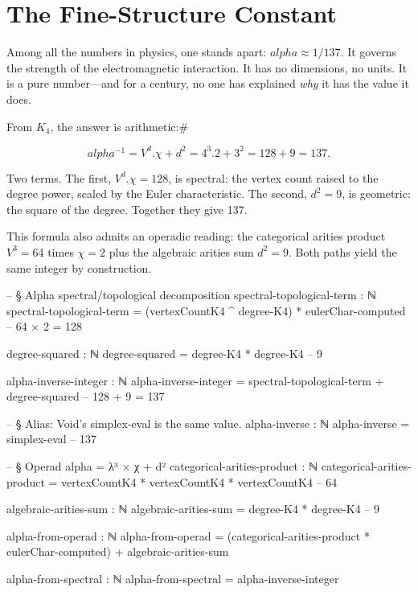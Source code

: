 \documentclass[11pt,a4paper]{book}
\def\alpha{alpha}%
\def\cdot{.}%
\begin{document}
\section{The Fine-Structure Constant}

Among all the numbers in physics, one stands apart: $\alpha \approx 1/137$. It governs the strength of the electromagnetic interaction. It has no dimensions, no units. It is a pure number---and for a century, no one has explained \emph{why} it has the value it does.

From $K_4$, the answer is arithmetic:# 

\[
\alpha^{-1} = V^d \cdot \chi + d^2 = 4^3 \cdot 2 + 3^2 = 128 + 9 = 137.
\]

Two terms. The first, $V^d \cdot \chi = 128$, is spectral: the vertex count raised to the degree power, scaled by the Euler characteristic. The second, $d^2 = 9$, is geometric: the square of the degree. Together they give 137.

This formula also admits an operadic reading: the categorical arities product $V^3 = 64$ times $\chi = 2$ plus the algebraic arities sum $d^2 = 9$. Both paths yield the same integer by construction.

\begin{code}
-- § Alpha spectral/topological decomposition
spectral-topological-term : ℕ
spectral-topological-term = (vertexCountK4 ^ degree-K4) * eulerChar-computed  -- 64 × 2 = 128

degree-squared : ℕ
degree-squared = degree-K4 * degree-K4  -- 9

alpha-inverse-integer : ℕ
alpha-inverse-integer = spectral-topological-term + degree-squared  -- 128 + 9 = 137

-- § Alias: Void's simplex-eval is the same value.
alpha-inverse : ℕ
alpha-inverse = simplex-eval  -- 137

-- § Operad alpha = λ³ × χ + d²
categorical-arities-product : ℕ
categorical-arities-product = vertexCountK4 * vertexCountK4 * vertexCountK4  -- 64

algebraic-arities-sum : ℕ
algebraic-arities-sum = degree-K4 * degree-K4  -- 9

alpha-from-operad : ℕ
alpha-from-operad = (categorical-arities-product * eulerChar-computed) + algebraic-arities-sum

alpha-from-spectral : ℕ
alpha-from-spectral = alpha-inverse-integer
\end{code}
\end{document}
